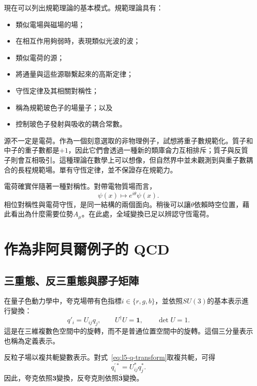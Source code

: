 現在可以列出規範理論的基本模式。規範理論具有：
\begin{itemize}
\item 類似電場與磁場的場；
\item 在相互作用夠弱時，表現類似光波的波；
\item 類似電荷的源；
\item 將通量與這些源聯繫起來的高斯定律；
\item 守恆定律及其相關對稱性；
\item 稱為規範玻色子的場量子；以及
\item 控制玻色子發射與吸收的耦合常數。
\end{itemize}
源不一定是電荷。作為一個刻意選取的非物理例子，試想將重子數規範化。質子和中子的重子數都是\(+1\)，因此它們會透過一種新的類庫侖力互相排斥；質子與反質子則會互相吸引。這種理論在數學上可以想像，但自然界中並未觀測到與重子數耦合的長程規範場。單有守恆定律，並不保證存在規範力。

電荷確實伴隨著一種對稱性。對帶電物質場而言，
\begin{equation}
\psi(x)\longmapsto e^{i\theta}\psi(x).
\label{eq:l5-u1}
\end{equation}
相位對稱性與電荷守恆，是同一結構的兩個面向。稍後可以讓\(\theta\)依賴時空位置，藉此看出為什麼需要位勢\(A_\mu\)。在此處，全域變換已足以辨認守恆電荷。

\section{作為非阿貝爾例子的 QCD}

\subsection{三重態、反三重態與膠子矩陣}

在量子色動力學中，夸克場帶有色指標\(i\in\{r,g,b\}\)，並依照\(SU(3)\)的基本表示進行變換：
\begin{equation}
q'_i=U_{ij}q_j,
\qquad
U^\dagger U=\boldsymbol 1,
\qquad
\det U=1.
\label{eq:l5-q-transform}
\end{equation}
這是在三維複數色空間中的旋轉，而不是普通位置空間中的旋轉。這個三分量表示也稱為定義表示。

反粒子場以複共軛變數表示。對式~\eqref{eq:l5-q-transform}取複共軛，可得
\begin{equation}
q_i^{\prime *}=U_{ij}^*q_j^*.
\label{eq:l5-antiquark-transform}
\end{equation}
因此，夸克依照\(\boldsymbol 3\)變換，反夸克則依照\(\bar{\boldsymbol 3}\)變換。

